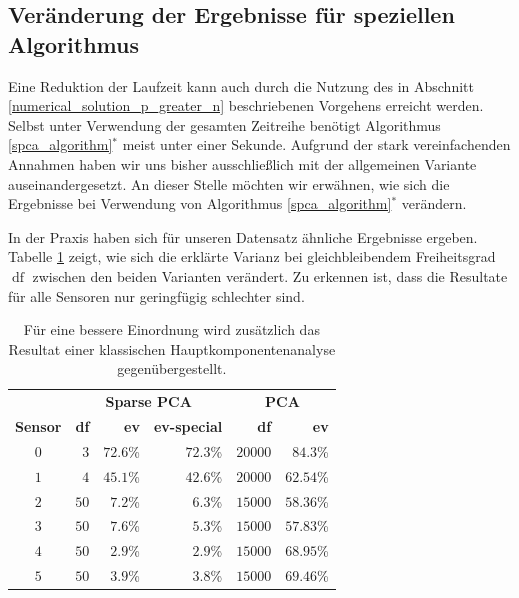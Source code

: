 \subsection{Veränderung der Ergebnisse für speziellen Algorithmus}
\label{comparison_special_case}

Eine Reduktion der Laufzeit kann auch durch die Nutzung des in Abschnitt \ref{numerical_solution_p_greater_n} beschriebenen Vorgehens erreicht werden. Selbst unter Verwendung der gesamten Zeitreihe benötigt Algorithmus \ref{spca_algorithm}$^*$ meist unter einer Sekunde. Aufgrund der stark vereinfachenden Annahmen haben wir uns bisher ausschließlich mit der allgemeinen Variante auseinandergesetzt. An dieser Stelle möchten wir erwähnen, wie sich die Ergebnisse bei Verwendung von Algorithmus \ref{spca_algorithm}$^*$ verändern.

In der Praxis haben sich für unseren Datensatz ähnliche Ergebnisse ergeben. Tabelle \ref{comparison_special_algorithm_results} zeigt, wie sich die erklärte Varianz bei gleichbleibendem Freiheitsgrad $\operatorname{df}$ zwischen den beiden Varianten verändert. Zu erkennen ist, dass die Resultate für alle Sensoren nur geringfügig schlechter sind. 

\begin{table}
\centering
\begin{tabular}{c|rrr|rr}
& \multicolumn{3}{c|}{\textbf{Sparse PCA}} & \multicolumn{2}{c}{\textbf{PCA}}\\
\textbf{Sensor} & \textbf{df} & \textbf{ev} & \textbf{ev-special} & \textbf{df} & \textbf{ev}\\\hline\rule{0pt}{1.1\normalbaselineskip}
$0$ & $3$ & $72.6$\% & $72.3$\% & $20000$ & $84.3$\%\\
$1$ & $4$ & $45.1$\% & $42.6$\% & $20000$ & $62.54$\%\\
$2$ & $50$ & $7.2$\% & $6.3$\% & $15000$ & $58.36$\%\\
$3$ & $50$ & $7.6$\% & $5.3$\% & $15000$ & $57.83$\%\\
$4$ & $50$ & $2.9$\% & $2.9$\% & $15000$ & $68.95$\%\\
$5$ & $50$ & $3.9$\% & $3.8$\% & $15000$ & $69.46$\%\\
\end{tabular}
\caption{Für eine bessere Einordnung wird zusätzlich das Resultat einer klassischen Hauptkomponentenanalyse gegenübergestellt.}
\label{comparison_special_algorithm_results}
\end{table}
\setlength{\tabcolsep}{6pt}

